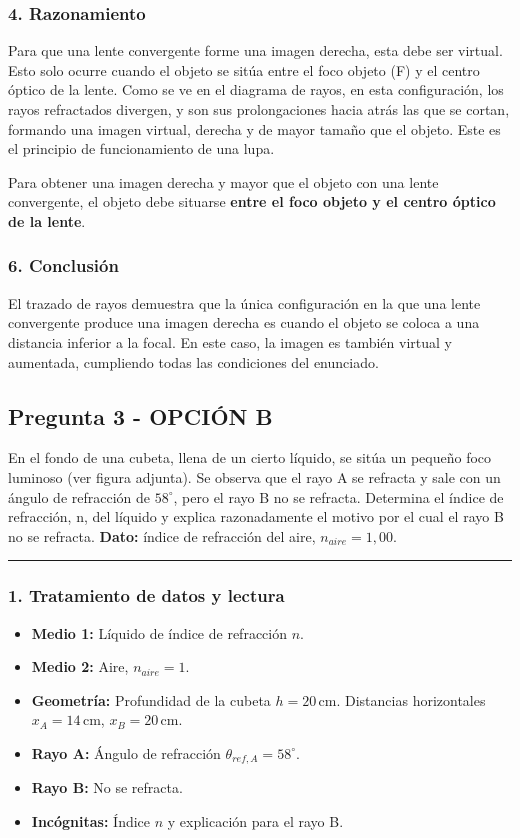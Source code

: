 \subsubsection*{4. Razonamiento}
Para que una lente convergente forme una imagen derecha, esta debe ser virtual. Esto solo ocurre cuando el objeto se sitúa entre el foco objeto (F) y el centro óptico de la lente. Como se ve en el diagrama de rayos, en esta configuración, los rayos refractados divergen, y son sus prolongaciones hacia atrás las que se cortan, formando una imagen virtual, derecha y de mayor tamaño que el objeto. Este es el principio de funcionamiento de una lupa.
\begin{cajaresultado}
Para obtener una imagen derecha y mayor que el objeto con una lente convergente, el objeto debe situarse \textbf{entre el foco objeto y el centro óptico de la lente}.
\end{cajaresultado}
\subsubsection*{6. Conclusión}
\begin{cajaconclusion}
El trazado de rayos demuestra que la única configuración en la que una lente convergente produce una imagen derecha es cuando el objeto se coloca a una distancia inferior a la focal. En este caso, la imagen es también virtual y aumentada, cumpliendo todas las condiciones del enunciado.
\end{cajaconclusion}
\newpage

\subsection{Pregunta 3 - OPCIÓN B}
\label{subsec:3B_2018_jul_ext}
\begin{cajaenunciado}
En el fondo de una cubeta, llena de un cierto líquido, se sitúa un pequeño foco luminoso (ver figura adjunta). Se observa que el rayo A se refracta y sale con un ángulo de refracción de $58^{\circ}$, pero el rayo B no se refracta. Determina el índice de refracción, n, del líquido y explica razonadamente el motivo por el cual el rayo B no se refracta.
\textbf{Dato:} índice de refracción del aire, $n_{aire}=1,00$.
\end{cajaenunciado}
\hrule
\subsubsection*{1. Tratamiento de datos y lectura}
\begin{itemize}
    \item \textbf{Medio 1:} Líquido de índice de refracción $n$.
    \item \textbf{Medio 2:} Aire, $n_{aire}=1$.
    \item \textbf{Geometría:} Profundidad de la cubeta $h=20\,\text{cm}$. Distancias horizontales $x_A=14\,\text{cm}$, $x_B=20\,\text{cm}$.
    \item \textbf{Rayo A:} Ángulo de refracción $\theta_{ref,A} = 58^\circ$.
    \item \textbf{Rayo B:} No se refracta.
    \item \textbf{Incógnitas:} Índice $n$ y explicación para el rayo B.
\end{itemize}
